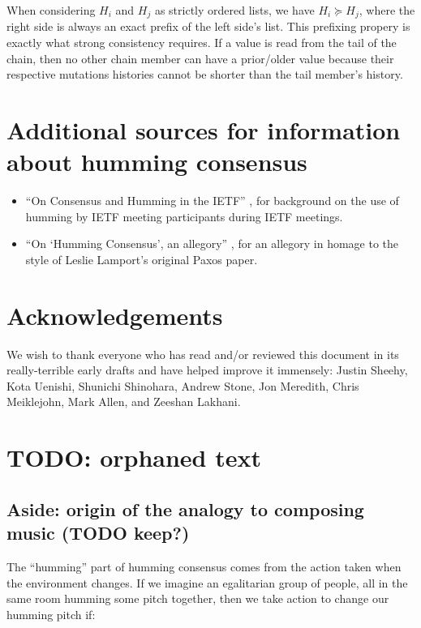 \documentclass[preprint,10pt]{sigplanconf}
\begin{document}
When considering $H_i$ and $H_j$ as strictly ordered lists, we have 
$H_i \succeq H_j$, where the right side is always an exact prefix of the left
side's list.  This prefixing propery is exactly what strong
consistency requires.  If a value is read from the tail of the chain,
then no other chain member can have a prior/older value because their
respective mutations histories cannot be shorter than the tail
member's history.

\section{Additional sources for information about humming consensus}

\begin{itemize}
\item ``On Consensus and Humming in the IETF'' \cite{rfc-7282}, for
background on the use of humming by IETF meeting participants during
IETF meetings.

\item ``On `Humming Consensus', an allegory'' \cite{humming-consensus-allegory},
for an allegory in homage to the style of Leslie Lamport's original Paxos
paper.
\end{itemize}

\section{Acknowledgements}

We wish to thank everyone who has read and/or reviewed this document
in its really-terrible early drafts and have helped improve it
immensely: Justin Sheehy, Kota Uenishi, Shunichi Shinohara, Andrew
Stone, Jon Meredith, Chris Meiklejohn, Mark Allen, and Zeeshan
Lakhani.

\section{TODO: orphaned text}

\subsection{Aside: origin of the analogy to composing music (TODO keep?)}
The ``humming'' part of humming consensus comes from the action taken
when the environment changes.  If we imagine an egalitarian group of
people, all in the same room humming some pitch together, then we take
action to change our humming pitch if:
\end{document}
